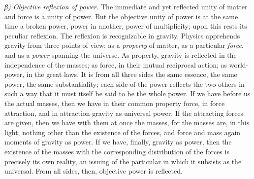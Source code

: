 \documentclass[12pt,a4paper]{book}
\newcommand{\subrunin}[1]{\emph{#1}\hspace{0.4em}}
\begin{document}
\subrunin{β) Objective reflexion of power.} The immediate and yet
reflected unity of matter and force is a unity of power. But the objective unity of
power is at the same time a broken power, power in another, power of multiplicity;
upon this rests its peculiar reflexion. The reflexion is recognizable in gravity.
Physics apprehends gravity from three points of view: as a \emph{property} of
matter, as a particular \emph{force}, and as a \emph{power} spanning the universe.
As property, gravity is reflected in the independence of the masses; as force, in
their mutual reciprocal action; as world-power, in the great laws. It is from all
three sides the same essence, the same power, the same substantiality; each side of
the power reflects the two others in such a way that it must itself be said to be
the whole power. If we have before us the actual masses, then we have in their
common property force, in force attraction, and in attraction gravity as universal
power. If the attracting forces are given, then we have with them at once
the masses, for the masses are, in this light, nothing other than the existence of
the forces, and force and mass again moments of gravity as power. If we have,
finally, gravity as power, then the existence of the masses with the corresponding
distribution of the forces is precisely its own reality, an issuing of the
particular in which it subsists as the universal. From all sides, then, objective
power is reflected.
\end{document}
